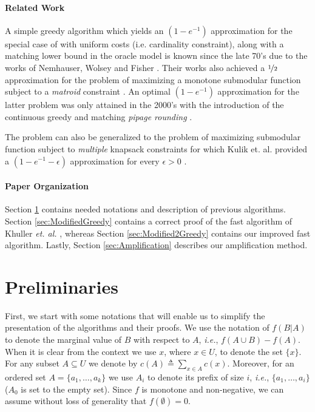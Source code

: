 \documentclass[a4paper,UKenglish,cleveref, autoref]{lipics-v2019}
\begin{document}
\paragraph*{Related Work}

A simple greedy algorithm which yields an $(1-e^{-1})$ approximation for the special
case of \SK with uniform costs (i.e. cardinality constraint), along with a matching 
lower bound in the oracle model is known since the late 70's due to the
works of Nemhauser, Wolsey and Fisher \cite{Nemhauser1978}\cite{NW78}.
Their works also achieved a $\nicefrac[]{1}{2}$ approximation for the problem
of maximizing a monotone submodular function subject to a {\em matroid}
constraint \cite{FNW78}. 
An optimal $(1-e^{-1})$ approximation for the latter problem was only attained in the 2000's with 
the introduction of the {continuous greedy} and matching 
	{\em pipage rounding } \cite{CCPV11}.

The problem can also be generalized to the problem of maximizing submodular function
subject to {\em multiple} knapsack constraints for which Kulik et. al. provided a $(1-e^{-1}-\epsilon)$ approximation for every $\epsilon>0$ \cite{KST13}.  


\paragraph*{Paper Organization}
Section \ref{sec:Preliminaries} contains needed notations and description of previous algorithms.
Section \ref{sec:ModifiedGreedy} contains a correct proof of the fast algorithm of Khuller {\em et. al.} \cite{khuller1999budgeted}, whereas Section \ref{sec:Modified2Greedy} contains our improved fast algorithm.
Lastly, Section \ref{sec:Amplification} describes our amplification method. 

\section{Preliminaries}\label{sec:Preliminaries}
First, we start with some notations that will enable us to simplify the presentation of the algorithms and their proofs.
We use the notation of $f(B|A)$ to denote the marginal value of $B$ with respect to $A$, {\em i.e.}, $f(A\cup B)-f(A)$.
When it is clear from the context we use $x$, where $x\in U$, to denote the set $\{ x\}$.
For any subset $A\subseteq U$ we denote by $c(A)\triangleq \sum _{x\in A}c(x)$.
Moreover, for an ordered set $A = \{a_1, \dots, a_k\}$ we use $A_i$ to denote its prefix of size $i$, {\em i.e.}, $\{a_1, \dots, a_i\}$ ($A_0$ is set to the empty set).
Since $f$ is monotone and non-negative, we can assume without loss of generality that $f(\emptyset)=0$.
\end{document}

